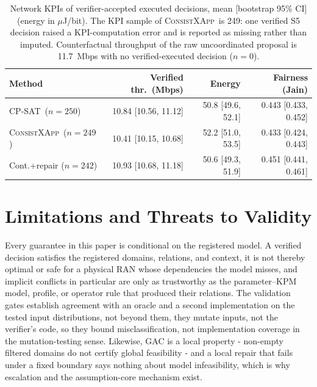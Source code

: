 \documentclass[pdflatex,sn-mathphys-num,iicol,oneside]{sn-jnl}
\newcommand{\method}{\textsc{ConsistXApp}}
\newcommand{\cpsat}{\textsc{CP-SAT}}
\begin{document}
\begin{table}[t]
\centering
\caption{Network KPIs of verifier-accepted executed decisions, mean
[bootstrap 95\% CI] (energy in $\mu$J/bit). The KPI sample of \method\
is 249: one verified S5 decision raised a KPI-computation error and is
reported as missing rather than imputed. Counterfactual throughput of
the raw uncoordinated proposal is 11.7~Mbps with no verified-executed
decision ($n{=}0$).}
\label{tab:kpi}
\setlength{\tabcolsep}{4pt}\small
\begin{tabular}{lrrr}
\toprule
Method & Verified thr.\ (Mbps) & Energy & Fairness (Jain)\\
\midrule
\cpsat\ ($n{=}250$) & 10.84 [10.56, 11.12] & 50.8 [49.6, 52.1] &
0.443 [0.433, 0.452]\\
\method\ ($n{=}249$) & 10.41 [10.15, 10.68] & 52.2 [51.0, 53.5] &
0.433 [0.424, 0.443]\\
Cont.+repair ($n{=}242$) & 10.93 [10.68, 11.18] & 50.6 [49.3, 51.9] &
0.451 [0.441, 0.461]\\
\bottomrule
\end{tabular}
\normalsize
\end{table}

\section{Limitations and Threats to Validity}
\label{sec:limitations}

Every guarantee in this paper is conditional on the registered model.
A verified decision satisfies the registered domains, relations, and
context, it is not thereby optimal or safe for a physical RAN whose
dependencies the model misses, and implicit conflicts in particular
are only as trustworthy as the parameter--KPM model, profile, or
operator rule that produced their relations. The validation gates
establish agreement with an oracle and a second implementation on the
tested input distributions, not beyond them, they mutate inputs, not
the verifier's code, so they bound misclassification, not
implementation coverage in the mutation-testing sense. Likewise, GAC
is a local property - non-empty filtered domains do not certify global
feasibility - and a local repair that fails under a fixed boundary
says nothing about model infeasibility, which is why escalation and
the assumption-core mechanism exist.
\end{document}
